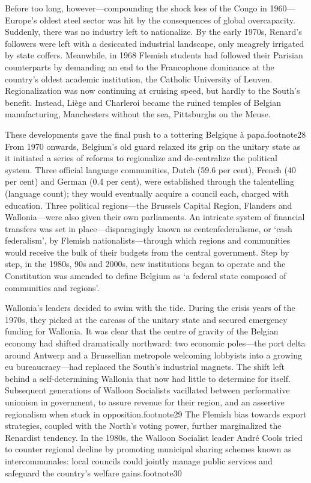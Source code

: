 \documentclass[
]{book}
\begin{document}
Before too long, however---compounding the shock loss of the Congo in 1960---Europe's oldest steel sector was hit by the consequences of global overcapacity. Suddenly, there was no industry left to nationalize. By the early 1970s, Renard's followers were left with a desiccated industrial landscape, only meagrely irrigated by state coffers. Meanwhile, in 1968 Flemish students had followed their Parisian counterparts by demanding an end to the Francophone dominance at the country's oldest academic institution, the Catholic University of Leuven. Regionalization was now continuing at cruising speed, but hardly to the South's benefit. Instead, Liège and Charleroi became the ruined temples of Belgian manufacturing, Manchesters without the sea, Pittsburghs on the Meuse.

These developments gave the final push to a tottering Belgique à papa.footnote28 From 1970 onwards, Belgium's old guard relaxed its grip on the unitary state as it initiated a series of reforms to regionalize and de-centralize the political system. Three official language communities, Dutch (59.6 per cent), French (40 per cent) and German (0.4 per cent), were established through the talentelling (language count); they would eventually acquire a council each, charged with education. Three political regions---the Brussels Capital Region, Flanders and Wallonia---were also given their own parliaments. An intricate system of financial transfers was set in place---disparagingly known as centenfederalisme, or `cash federalism', by Flemish nationalists---through which regions and communities would receive the bulk of their budgets from the central government. Step by step, in the 1980s, 90s and 2000s, new institutions began to operate and the Constitution was amended to define Belgium as `a federal state composed of communities and regions'.

Wallonia's leaders decided to swim with the tide. During the crisis years of the 1970s, they picked at the carcass of the unitary state and secured emergency funding for Wallonia. It was clear that the centre of gravity of the Belgian economy had shifted dramatically northward: two economic poles---the port delta around Antwerp and a Brussellian metropole welcoming lobbyists into a growing eu bureaucracy---had replaced the South's industrial magnets. The shift left behind a self-determining Wallonia that now had little to determine for itself. Subsequent generations of Walloon Socialists vacillated between performative unionism in government, to assure revenue for their region, and an assertive regionalism when stuck in opposition.footnote29 The Flemish bias towards export strategies, coupled with the North's voting power, further marginalized the Renardist tendency. In the 1980s, the Walloon Socialist leader André Cools tried to counter regional decline by promoting municipal sharing schemes known as intercommunales: local councils could jointly manage public services and safeguard the country's welfare gains.footnote30
\end{document}
